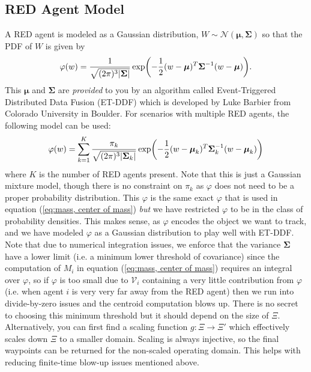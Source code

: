 \documentclass{article}
\begin{document}
\subsection{RED Agent Model}
A RED agent is modeled as a Gaussian distribution, $W \sim \mathcal{N}(\boldsymbol{\mu}, \boldsymbol{\Sigma})$ so that the PDF of $W$ is given by 
\begin{equation}
	\displaystyle \varphi(w) = \frac{1}{\sqrt{(2\pi)^3 \abs{\boldsymbol{\Sigma}}}} \exp(-\frac{1}{2} (w - \boldsymbol{\mu})^T\boldsymbol{\Sigma}^{-1}(w - \boldsymbol{\mu})).
\end{equation}
This $\boldsymbol{\mu}$ and $\boldsymbol{\Sigma}$ are \textit{provided} to you by an algorithm called Event-Triggered Distributed Data Fusion (ET-DDF) which is developed by Luke Barbier from Colorado University in Boulder. For scenarios with multiple RED agents, the following model can be used:
\begin{equation}
	\displaystyle \varphi(w) = \sum\limits_{k=1}^{K}{\frac{\pi_k}{\sqrt{(2\pi)^3 \abs{\boldsymbol{\Sigma}_k}}} \exp(-\frac{1}{2} (w - \boldsymbol{\mu}_k)^T\boldsymbol{\Sigma}_k^{-1}(w - \boldsymbol{\mu}_k))}
\end{equation}
where $K$ is the number of RED agents present. Note that this is just a Gaussian mixture model, though there is no constraint on $\pi_k$ as $\varphi$ does not need to be a proper probability distribution. This $\varphi$ is the same exact $\varphi$ that is used in equation (\ref{eq:mass, center of mass}) \textit{but} we have restricted $\varphi$ to be in the class of probability densities. This makes sense, as $\varphi$ encodes the object we want to track, and we have modeled $\varphi$ as a Gaussian distribution to play well with ET-DDF. Note that due to numerical integration issues, we enforce that the variance $\boldsymbol{\Sigma}$ have a lower limit (i.e. a minimum lower threshold of covariance) since the computation of $M_i$ in equation (\ref{eq:mass, center of mass}) requires an integral over $\varphi$, so if $\varphi$ is too small due to $\mathcal{V}_i$ containing a very little contribution from $\varphi$ (i.e. when agent $i$ is very very far away from the RED agent) then we run into divide-by-zero issues and the centroid computation blows up. There is no secret to choosing this minimum threshold but it should depend on the size of $\Xi$. Alternatively, you can first find a scaling function $g : \Xi \to \Xi'$ which effectively scales down $\Xi$ to a smaller domain. Scaling is always injective, so the final waypoints can be returned for the non-scaled operating domain. This helps with reducing finite-time blow-up issues mentioned above. 
\end{document}
